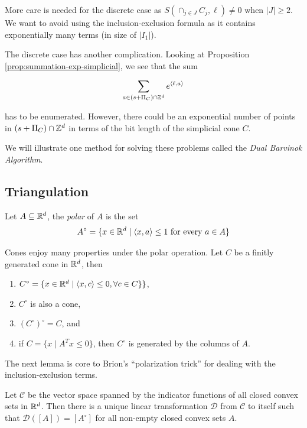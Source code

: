 More care is needed for the discrete case as $S(\cap_{j \in J} C_j, \ell) \neq 0$ when $|J| \geq 2$. We want to avoid using the inclusion-exclusion formula as it contains exponentially many terms (in size of $|I_1|$). 

The discrete case has another complication. Looking at Proposition \ref{prop:summation-exp-simplicial}, we see that the sum 

\[ \sum_{a \in (s+\Pi_C) \cap {\mathbb Z}^d} e^{{\langle} \ell, a {\rangle}}\]

has to be enumerated. However, there could be an exponential number of points in $(s+\Pi_C) \cap {\mathbb Z}^d$ in terms of the bit length of the simplicial cone $C$. 

We will illustrate one method for solving these problems called the \emph{Dual Barvinok Algorithm}.


\subsection{Triangulation}
\begin{definition}
Let $A \subseteq {\mathbb R}^d$, the \emph{polar} of $A$ is the set 
\[ A^\circ = \{ x \in {\mathbb R}^d \mid  {\langle} x, a {\rangle} \leq 1 \text{ for every } a \in A \}  \]
\end{definition}

\begin{lemma}
Cones enjoy many properties under the polar operation. Let $C$ be a finitly generated cone in ${\mathbb R}^d$, then

\begin{enumerate}
\item $C^\circ = \{ x \in {\mathbb R}^d \mid {\langle} x, c {\rangle} \leq 0, \forall c \in C \} \}$, 
\item $C^\circ$ is also a cone,
\item $(C^\circ)^\circ = C$, and
\item if $C = \{ x \mid A^Tx \leq 0 \}$, then $C^\circ$ is generated by the columns of $A$.
\end{enumerate}
\end{lemma}

The next lemma is core to  Brion's ``polarization trick'' \cite{Brion88} for dealing with the inclusion-exclusion terms.

\begin{lemma}
Let $\mathcal{C}$ be the vector space spanned by the indicator functions of all closed convex sets in ${\mathbb R}^d$. Then there is a unique linear transformation  $\mathcal{D}$ from $\mathcal{C}$ to itself such that $\mathcal{D}([A]) = [A^\circ]$ for all non-empty closed convex sets $A$.
\end{lemma}

